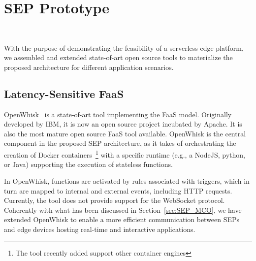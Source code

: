 \section{SEP Prototype}~\label{sec:prototype}

With the purpose of demonstrating the feasibility of a serverless edge platform, we assembled and extended state-of-art open source tools to materialize the proposed architecture for different application scenarios.


\subsection{Latency-Sensitive FaaS}

OpenWhisk~\cite{OpenWhisk} is a state-of-art tool implementing the FaaS model. Originally developed by IBM, it is now an open source project incubated by Apache. It is also the most mature open source FaaS tool available. OpenWhisk is the central component in the proposed SEP architecture, 
as it takes of orchestrating the creation of Docker containers~\footnote{The tool recently added support other container engines} with a specific runtime (e.g., a NodeJS, python, or Java) supporting the execution of stateless functions.


In OpenWhisk, functions are activated by rules associated with triggers, which in turn are mapped to internal and external events, including HTTP requests. Currently, the tool does not provide support for the WebSocket protocol. Coherently with what has been discussed in Section~\ref{sec:SEP_MCO}, we have extended OpenWhisk to enable a more efficient communication between SEPs and edge devices hosting real-time and interactive applications.  

